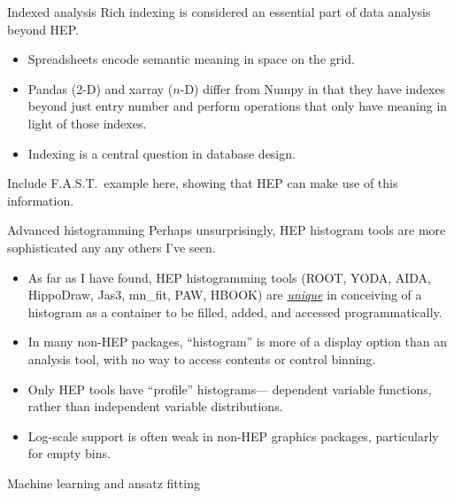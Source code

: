 \documentclass[aspectratio=169]{beamer}
\begin{document}
\begin{frame}{Indexed analysis}
\large
\vspace{0.5 cm}
Rich indexing is considered an essential part of data analysis beyond HEP.
\begin{itemize}
\item Spreadsheets encode semantic meaning in space on the grid.
\item Pandas (2-D) and xarray ($n$-D) differ from Numpy in that they have indexes beyond just entry number and perform operations that only have meaning in light of those indexes.
\item Indexing is a central question in database design.
\end{itemize}

\vspace{0.5 cm}
Include F.A.S.T.\ example here, showing that HEP can make use of this information.
\end{frame}

\begin{frame}{Advanced histogramming}
\large
\vspace{0.5 cm}
{\Large Perhaps unsurprisingly, HEP histogram tools are more sophisticated any any others I've seen.}
\vspace{0.25 cm}
\begin{itemize}\setlength{\itemsep}{0.25 cm}
\item<2-> As far as I have found, HEP histogramming tools (ROOT, YODA, AIDA, HippoDraw, Jas3, mn\_fit, PAW, HBOOK) are \underline{\it unique} in conceiving of a histogram as a container to be filled, added, and accessed programmatically.
\item<3-> In many non-HEP packages, ``histogram'' is more of a display option than an analysis tool, with no way to access contents or control binning.
\item<4-> Only HEP tools have ``profile'' histograms--- dependent variable functions, rather than independent variable distributions.
\item<5-> Log-scale support is often weak in non-HEP graphics packages, particularly for empty bins.
\end{itemize}
\begin{center}
\end{center}
\end{frame}

\begin{frame}{Machine learning and ansatz fitting}
\end{frame}
\end{document}
